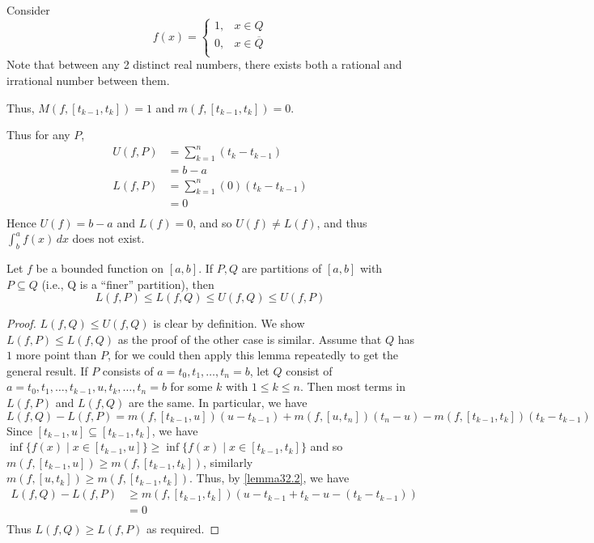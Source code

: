 \documentclass{article}
\begin{document}
\begin{example}
  Consider \[
    f(x) =
    \begin{cases}
      1, & x \in Q\\
      0, & x \in \overline{Q}\\
    \end{cases}
  \]
  Note that between any 2 distinct real numbers, there exists both a rational and irrational number between them.

  Thus, $M(f, [t_{k-1}, t_k]) = 1$ and $m(f, [t_{k-1}, t_k]) = 0$.

  Thus for any $P$,
  \begin{align*}
    U(f, P) &= \sum_{k=1}^n (t_k - t_{k-1})\\
    &= b-a\\
    L(f, P) &= \sum_{k=1}^n (0)(t_k - t_{k-1})\\
    &= 0\\
  \end{align*}
  Hence $U(f) = b-a$ and $L(f) = 0$, and so $U(f) \neq L(f)$, and thus $\int_b^a f(x) \, dx$ does not exist.
\end{example}
\begin{clemma}[Lemma 32.2]
  Let $f$ be a bounded function on $[a, b]$. If $P, Q$ are partitions of $[a, b]$ with $P \subseteq Q$ (i.e., Q is a ``finer'' partition), then \[
    L(f, P) \leq L(f, Q) \leq U(f, Q) \leq U(f, P)
  \]
\end{clemma}
\begin{proof}
  $L(f, Q) \leq U(f, Q)$ is clear by definition. We show $L(f, P) \leq L(f, Q)$ as the proof of the other case is similar. Assume that $Q$ has $1$ more point than $P$, for we could then apply this lemma repeatedly to get the general result. If $P$ consists of $a=t_0, t_1, \ldots, t_n = b$, let $Q$ consist of $a = t_0, t_1, \ldots, t_{k-1}, u, t_k, \ldots, t_n = b$ for some $k$ with $1 \leq k \leq n$. Then most terms in $L(f, P)$ and $L(f, Q)$ are the same. In particular, we have
  \begin{equation}\label{lemma32.2}
    L(f, Q) - L(f, P) = m(f, [t_{k-1}, u])(u - t_{k-1}) + m(f, [u, t_n])(t_n - u) - m(f, [t_{k-1}, t_k])(t_k - t_{k-1})
  \end{equation}
  Since $[t_{k-1}, u] \subseteq [t_{k-1}, t_k]$, we have $\inf \{f(x) \mid x \in [t_{k-1}, u]\} \geq \inf \{f(x) \mid x \in [t_{k-1}, t_k]\}$ and so $m(f, [t_{k-1}, u]) \geq m(f, [t_{k-1}, t_k])$, similarly $m(f, [u, t_k]) \geq m(f, [t_{k-1}, t_k])$. Thus, by \eqref{lemma32.2}, we have
  \begin{align*}
    L(f, Q) - L(f, P) &\geq m(f, [t_{k-1}, t_k])(u - t_{k-1} + t_k - u - (t_k - t_{k-1}))\\
    &= 0\\
  \end{align*}
  Thus $L(f, Q) \geq L(f, P)$ as required.
\end{proof}
\end{document}

